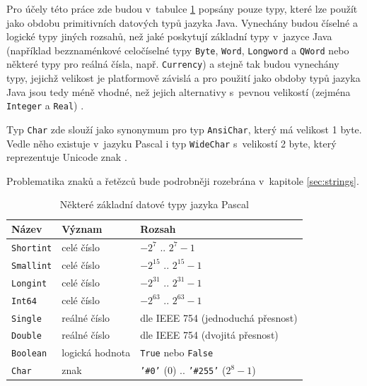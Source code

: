 \documentclass[czech,BP]{thesiskiv}
\begin{document}
Pro účely této práce zde budou v~tabulce \ref{table:pas-types} popsány pouze typy, které lze použít jako obdobu primitivních datových typů jazyka Java. Vynechány budou číselné a logické typy jiných rozsahů, než jaké poskytují základní typy v~jazyce Java (například bezznaménkové celočíselné typy \texttt{Byte}, \texttt{Word}, \texttt{Longword} a \texttt{QWord} nebo některé typy pro reálná čísla, např. \texttt{Currency}) a stejně tak budou vynechány typy, jejichž velikost je platformově závislá a pro použití jako obdoby typů jazyka Java jsou tedy méně vhodné, než jejich alternativy s~pevnou velikostí (zejména \texttt{Integer} a \texttt{Real}) \cite{pas-guide-types, pas-guide-integer, pas-guide-boolean, pas-guide-real}.\par

Typ \texttt{Char} zde slouží jako synonymum pro typ \texttt{AnsiChar}, který má velikost 1 byte. Vedle něho existuje v~jazyku Pascal i typ \texttt{WideChar} s~velikostí 2 byte, který reprezentuje Unicode znak \cite{pas-guide-types, pas-guide-ansichar, pas-guide-widechar}.\par

Problematika znaků a řetězců bude podrobněji rozebrána v~kapitole \ref{sec:strings}.

\begin{table}\centering
\caption{Některé základní datové typy jazyka Pascal}
\begin{tabular}{| l | l | l |}
\hline
\textbf{Název} & \textbf{Význam} & \textbf{Rozsah} \\ \hline
\texttt{Shortint} & celé číslo & $-2^7$ .. $2^7-1$ \\ \hline
\texttt{Smallint} & celé číslo & $-2^{15}$ .. $2^{15}-1$ \\ \hline
\texttt{Longint} & celé číslo & $-2^{31}$ .. $2^{31}-1$ \\ \hline
\texttt{Int64} & celé číslo & $-2^{63}$ .. $2^{63}-1$ \\ \hline
\texttt{Single} & reálné číslo & dle IEEE 754 (jednoduchá přesnost) \\ \hline
\texttt{Double} & reálné číslo & dle IEEE 754 (dvojitá přesnost) \\ \hline
\texttt{Boolean} & logická hodnota & \texttt{True} nebo \texttt{False} \\ \hline
\texttt{Char} & znak & \texttt{'\#0'} ($0$) .. \texttt{'\#255'} ($2^{8} - 1$) \\ \hline
\end{tabular}
\label{table:pas-types}
\end{table}
\end{document}
